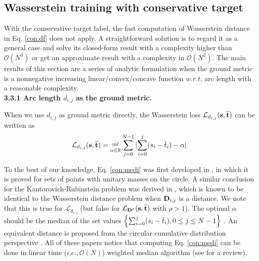 \subsection{Wasserstein training with conservative target}

With the conservative target label, the fast computation of Wasserstein distance in Eq. \eqref{con:df} does not apply. A straightforward solution is to regard it as a general case and solve its closed-form result with a complexity higher than $\mathcal{O}(N^3)$ or get an approximate result with a complexity in $\mathcal{O}(N^2)$. The main results of this section are a series of analytic formulation when the ground metric is a nonnegative increasing linear/convex/concave function $w.r.t.$ arc length with a reasonable complexity.\\





\noindent\textbf{3.3.1 Arc length $d_{i,j}$ as the ground metric.}


When we use $d_{i,j}$ as ground metric directly, the Wasserstein loss $\mathcal{L}_{d_{i,j}}(\rm{\textbf{s},\overline{\textbf{t}}})$ can be written as \begin{equation}
\mathcal{L}_{d_{i,j}}{(\rm{{\textbf{s},\overline{\textbf{t}}}})=\mathop{}_{\alpha\in\mathbb{R}}^{inf}}\sum_{j=0}^{N-1}|{\sum_{i=0}^{j}(s_i-\overline{{t}}_i)}-\alpha|\label{con:medi}
\end{equation}

To the best of our knowledge, Eq. \eqref{con:medi} was first developed in \cite{werman1986bipartite}, in which it is proved for sets of points with unitary masses on the circle. A similar conclusion for the Kantorovich-Rubinstein problem was derived in \cite{cabrelli1995kantorovich,cabrelli1998linear}, which is known to be identical to the Wasserstein distance problem when ${{\rm\textbf{D}}_{i,j}}$ is a distance. We note that this is true for $\mathcal{L}_{d_{i,j}}$ (but false for $\mathcal{L}_{{\rm\textbf{D}}^{\rho}}{(\rm{{\textbf{s},\overline{\textbf{t}}}})}$ with $\rho>1$). The optimal $\alpha$ should be the median of the set values $\left\{\sum_{i=0}^{j}(s_i-\overline{{t}}_i), 0\leq j\leq {\scriptsize{N}}-1\right\}$ \cite{pele2008linear}. An equivalent distance is proposed from the circular cumulative distribution perspective \cite{rabin2009statistical}. All of these papers notice that computing Eq. \eqref{con:medi} can be done in linear time ($i.e., \mathcal{O}(N)$) weighted median algorithm (see \cite{villani2003topics} for a review).

